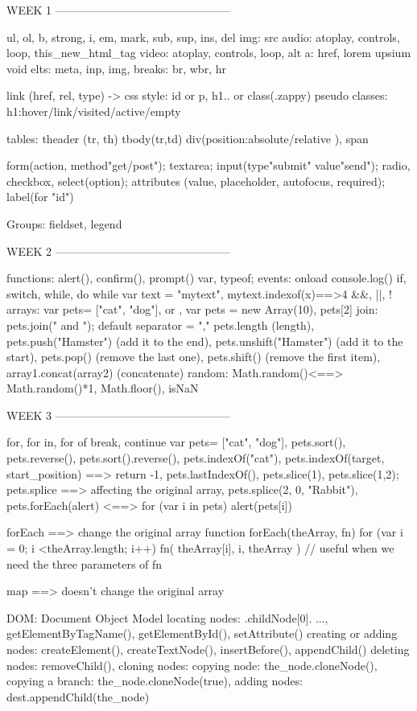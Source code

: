 

WEEK 1 -----------------------------------------------

ul, ol, b, strong, i, em, mark, sub, sup, ins, del
img: src
audio: atoplay, controls, loop, this_new_html_tag
video: atoplay, controls, loop, alt
a: href, lorem upsium
void elts: meta, inp, img, breaks: br, wbr, hr

link (href, rel, type) -> css
style: id or p, h1.. or class(.zappy)
pseudo classes: h1:hover/link/visited/active/empty

tables: theader (tr, th) tbody(tr,td)
div(position:absolute/relative ), span

form(action, method"get/post"); textarea; input(type"submit"  value"send"); radio, checkbox, select(option); attributes (value, placeholder, autofocus, required); label(for "id")

Groups: fieldset, legend


WEEK 2 -----------------------------------------------

functions: alert(), confirm(), prompt()
var, typeof;
events: onload
console.log()
if, switch, while, do while
var text = "mytext", mytext.indexof(x)==>4
&&, ||, !
arrays: var pets= ["cat", "dog"], or , var pets = new Array(10), pets[2]
join:		pets.join(" and "); default separator = ","
pets.length (length), pets.push("Hamster") (add it to the end), pets.unshift("Hamster") (add it to the start), pets.pop() (remove the last one), pets.shift() (remove the first item), array1.concat(array2) (concatenate)
random: Math.random()<==> Math.random()*1, Math.floor(), isNaN


WEEK 3 -----------------------------------------------

for, for in, for of
break, continue
var pets= ["cat", "dog"], pets.sort(), pets.reverse(), pets.sort().reverse(), pets.indexOf("cat"), pets.indexOf(target, start_position) ==> return -1, pets.lastIndexOf(), pets.slice(1), pets.slice(1,2); pets.splice ==> affecting the original array, pets.splice(2, 0, "Rabbit"),  
pets.forEach(alert) <==> for (var i in pets) { alert(pets[i]) }

forEach ==> change the original array
function forEach(theArray, fn) {
	for (var i = 0; i <theArray.length; i++){
		fn( theArray[i], i, theArray ) 
	}
} // useful when we need the three parameters of fn

map ==> doesn't change the original array

DOM: Document Object Model
locating nodes:  .childNode[0]. ..., getElementByTagName(), getElementById(), setAttribute()
creating or adding nodes: createElement(), createTextNode(), insertBefore(), appendChild()
deleting nodes: removeChild(), 
cloning nodes: copying node: the_node.cloneNode(), copying a branch: the_node.cloneNode(true), adding nodes: dest.appendChild(the_node)

